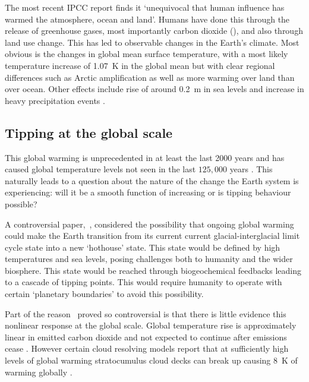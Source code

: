 The most recent IPCC report \parencite{AR6} finds it `unequivocal that human influence has warmed the atmosphere, ocean and land'. Humans have done this through the release of greenhouse
gases, most importantly carbon dioxide (), and also through land use change. This has led to observable changes in the Earth's climate. Most obvious is the changes in global mean surface
temperature, with a most likely temperature increase of \SI{1.07}{\kelvin} \parencite{AR6} in the global mean but with clear regional differences \parencite{Morice2021} such as
Arctic amplification as well as more warming over land than over ocean. Other effects include rise of around \SI{0.2}{\meter} in sea levels \parencite{Frederikse2020} and increase in heavy precipitation
events \parencite{Fischer2016}.

\subsection{Tipping at the global scale}
This global warming is unprecedented in at least the last 2000 years and has caused global temperature levels not seen in the last $125,000$ years \parencite{AR6}. This naturally leads to a question
about the nature of the change the Earth system is experiencing: will it be a smooth function of increasing  or is tipping behaviour possible?

A controversial paper,~\cite{Steffen2018}, considered the possibility that ongoing global warming could make the Earth transition from its current current glacial-interglacial limit cycle
state into a new `hothouse' state. This state would be defined by high temperatures and sea levels, posing challenges both to humanity and the wider biosphere. This state would be reached
through biogeochemical feedbacks leading to a cascade of tipping points. This would require humanity to operate with certain `planetary boundaries' \parencite{Rockstrom2009} to avoid this possibility.

Part of the reason~\cite{Steffen2018} proved so controversial is that there is little evidence this nonlinear response at the global scale. Global temperature rise is approximately linear
in emitted carbon dioxide \parencite{Allen2009,Rogelj2019} and not expected to continue after emissions cease \parencite{MacDougall2020}. However certain cloud resolving models
report that at sufficiently high levels of global warming stratocumulus cloud decks can break up causing \SI{8}{\kelvin} of warming globally \parencite{Schneider2019}.

